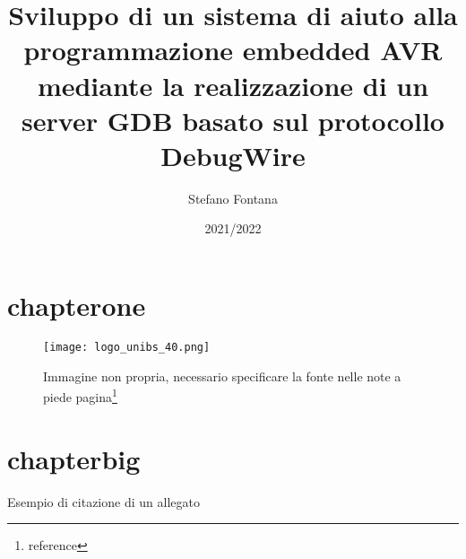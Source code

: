 \documentclass[12pt]{book}
\title{Sviluppo di un sistema di aiuto alla programmazione embedded AVR mediante la realizzazione di un server GDB basato sul protocollo DebugWire}
\author{Stefano Fontana}
\date{2021/2022}
\begin{document}
    \maketitle

    \frontmatter
    \tableofcontents
    \cleardoublepage%

    
     
    \mainmatter%

    

    \chapter{chapterone}
    \blindtext[1]\cite{knuth:1984}
    \blindtext[1]\cite{latex:companion}
    \blindtext[1]

        \begin{figure}[t]
            \centering
            \texttt{[image: logo\_unibs\_40.png]}
            \caption[TOF content]{Immagine non propria, necessario specificare la fonte nelle note a piede pagina\footnote{reference}\cite{img:unibs40}}%
            \label{fig:unibslogo}
        \end{figure}
    

    \chapter{chapterbig}
    Esempio di citazione di un allegato
    
    \blindtext[3]

    

    



    \listoffigures
    \cleardoublepage%
    \listoftables
    \cleardoublepage%
    
\end{document}
